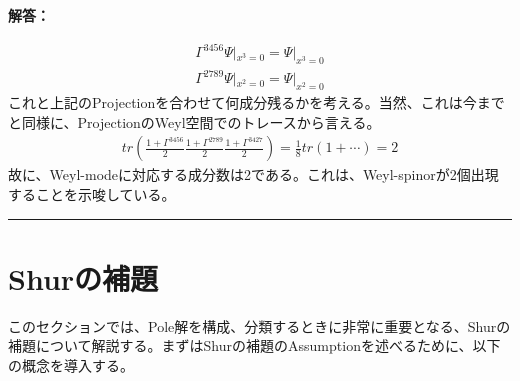 \documentclass[dvipdfmx,a4paper,10.5pt]{article}
\numberwithin{equation}{section}
\newenvironment{answerbox}
{\begin{prooflabel}\textbf{解答：}\end{prooflabel}\vspace{0.8em}}
{\par\vspace{1em}\hrule\vspace{1em}}
\begin{document}
\begin{answerbox}
    \begin{align*}
        \Gamma^{3456}\Psi|_{x^{3}=0}=\Psi|_{x^{3}=0}\\
        \Gamma^{2789}\Psi|_{x^{2}=0}=\Psi|_{x^{2}=0}
    \end{align*}
    これと上記のProjectionを合わせて何成分残るかを考える。当然、これは今までと同様に、ProjectionのWeyl空間でのトレースから言える。
    \begin{align*}
        tr(\frac{1+\Gamma^{3456}}{2}\frac{1+\Gamma^{2789}}{2}\frac{1+\Gamma^{3427}}{2})=\frac{1}{8}tr(1+\cdots)=2
    \end{align*}
    故に、Weyl-modeに対応する成分数は2である。これは、Weyl-spinorが2個出現することを示唆している。
\end{answerbox}

\appendix
\section{Shurの補題}
このセクションでは、Pole解を構成、分類するときに非常に重要となる、Shurの補題について解説する。まずはShurの補題のAssumptionを述べるために、以下の概念を導入する。
\end{document}

